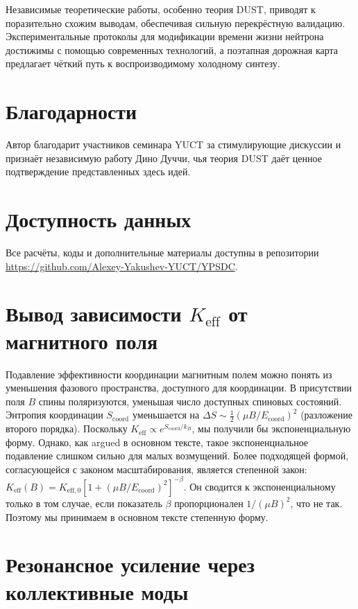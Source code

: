 \documentclass[12pt]{article}
\theoremstyle{remark}
\newcommand{\Keff}{K_{\mathrm{eff}}}
\newcommand{\Keffzero}{K_{\mathrm{eff},0}}
\begin{document}
	Независимые теоретические работы, особенно теория DUST, приводят к поразительно схожим выводам, обеспечивая сильную перекрёстную валидацию. Экспериментальные протоколы для модификации времени жизни нейтрона достижимы с помощью современных технологий, а поэтапная дорожная карта предлагает чёткий путь к воспроизводимому холодному синтезу.
	
	\section*{Благодарности}
	Автор благодарит участников семинара YUCT за стимулирующие дискуссии и признаёт независимую работу Дино Дуччи, чья теория DUST даёт ценное подтверждение представленных здесь идей.
	
	\section*{Доступность данных}
	Все расчёты, коды и дополнительные материалы доступны в репозитории \url{https://github.com/Alexey-Yakushev-YUCT/YPSDC}.
	
	\appendix
	\section{Вывод зависимости \(\Keff\) от магнитного поля}
	\label{app:B}
	
	Подавление эффективности координации магнитным полем можно понять из уменьшения фазового пространства, доступного для координации. В присутствии поля \(B\) спины поляризуются, уменьшая число доступных спиновых состояний. Энтропия координации \(S_{\text{coord}}\) уменьшается на \(\Delta S \sim \frac{1}{2} (\mu B / E_{\mathrm{coord}})^2\) (разложение второго порядка). Поскольку \(\Keff \propto e^{S_{\text{coord}}/k_B}\), мы получили бы экспоненциальную форму. Однако, как argued в основном тексте, такое экспоненциальное подавление слишком сильно для малых возмущений. Более подходящей формой, согласующейся с законом масштабирования, является степенной закон: \(\Keff(B) = \Keffzero [1 + (\mu B/E_{\mathrm{coord}})^2]^{-\beta}\). Он сводится к экспоненциальному только в том случае, если показатель \(\beta\) пропорционален \(1/(\mu B)^2\), что не так. Поэтому мы принимаем в основном тексте степенную форму.
	
	\section{Резонансное усиление через коллективные моды}
	\label{app:resonance}
	
\end{document}
